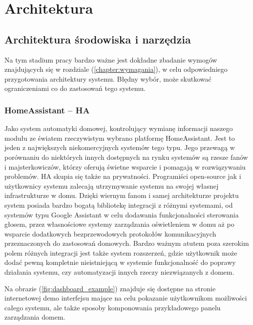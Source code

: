 
\chapter{Architektura}

\section{Architektura środowiska i narzędzia}
Na tym stadium pracy bardzo ważne jest dokładne zbadanie wymogów znajdujących się w rozdziale (\ref{chapter:wymagania}), w celu odpowiedniego przygotowania architektury systemu. Błędny wybór, może skutkować ograniczeniami co do zastosowań tego systemu.

\subsection{HomeAssistant -- HA}
Jako system automatyki domowej, kontrolujący wymianę informacji naszego modułu ze światem rzeczywistym wybrano platformę HomeAssistant. Jest to jeden z największych niekomercyjnych systemów tego typu. Jego przewagą w porównaniu do niektórych innych dostępnych na rynku systemów są rzesze fanów i majsterkowiczów, którzy oferują świetne wsparcie i pomagają w rozwiązywaniu problemów. HA skupia się także na prywatności. Programiści open-source jak i użytkownicy systemu zalecają utrzymywanie systemu na swojej własnej infrastrukturze w domu. Dzięki wiernym fanom i samej architekturze projektu system posiada bardzo bogatą bibliotekę integracji z różnymi systemami, od systemów typu Google Assistant w celu dodawania funkcjonalności sterowania głosem, przez własnościowe systemy zarządzania oświetleniem w domu aż po wsparcie dodatkowych bezprzewodowych protokołów komunikacyjnych przeznaczonych do zastosowań domowych. Bardzo ważnym atutem poza szerokim polem różnych integracji jest także system rozszerzeń, gdzie użytkownik może dodać pewną kompletnie nieistniejącą w systemie funkcjonalność do poprawy działania systemu, czy automatyzacji innych rzeczy niezwiązanych z domem.

Na obrazie (\ref{fig:dashboard_example}) znajduje się dostępne na stronie internetowej demo interfejsu mające na celu pokazanie użytkownikom możliwości całego systemu, ale także sposoby komponowania przykładowego panelu zarządzania domem.

